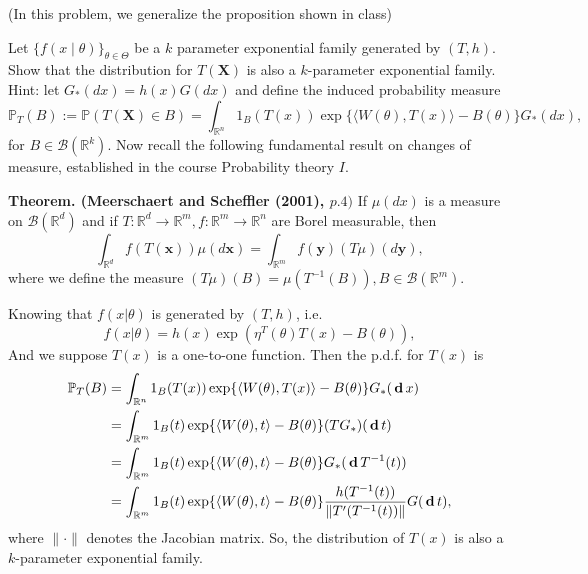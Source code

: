\begin{exercise}
    (In this problem, we generalize the proposition shown in class) 
    
    Let \(\{f( x \mid \theta)\}_{\theta \in \Theta}\) be a \(k\) parameter exponential family generated by \((T, h)\). Show that the distribution for \(T(\mathbf{X})\) is also a \(k\)-parameter exponential family. Hint: let \(G_{*}(d  x)=h( x) G(d  x)\) and define the induced probability measure
    \[
        \mathbb{P}_{T}(B):=\mathbb{P}(T(\mathbf{X}) \in B)=\int_{\mathbb{R}^{n}} 1_{B}(T( x)) \exp \{\langle W(\theta), T( x)\rangle-B(\theta)\} G_{*}(d  x), 
    \]
    for \(B \in \mathcal{B}\left(\mathbb{R}^{k}\right)\). Now recall the following fundamental result on changes of measure, established in the course Probability theory \(I\). 

    {\bfseries Theorem. (Meerschaert and Scheffler (2001), \(p .4)\)} If \(\mu(d x)\) is a measure on \(\mathcal{B}\left(\mathbb{R}^{d}\right)\) and if \(T: \mathbb{R}^{d} \rightarrow \mathbb{R}^{m}, f: \mathbb{R}^{m} \rightarrow \mathbb{R}^{n}\) are Borel measurable, then
    \[
        \int_{\mathbb{R}^{d}} f(T(\boldsymbol{x})) \mu(d \boldsymbol{x})=\int_{\mathbb{R}^{m}} f(\boldsymbol{y})(T \mu)(d \boldsymbol{y}),
    \]
    where we define the measure \((T \mu)(B)=\mu\left(T^{-1}(B)\right), B \in \mathcal{B}\left(\mathbb{R}^{m}\right)\). 
\end{exercise}

\begin{solution}
    Knowing that $f(x|\theta)$ is generated by $(T,h)$, i.e. 
    \[
        f(x|\theta)=h(x)\exp\left(\eta^T(\theta)T(x)-B(\theta)\right), 
    \]
    And we suppose $T(x)$ is a one-to-one function. Then the p.d.f. for $T(x)$ is
    \[
        \begin{aligned}
            \mathbb{P}_{T}(B)&=\int_{\mathbb{R}^{n}} 1_{B}(T( x)) \exp \{\langle W(\theta), T( x)\rangle-B(\theta)\} G_{*}(\,\mathbf{d}\,  x)\\
            &=\int_{\mathbb{R}^m}1_{B}(t) \exp \{\langle W(\theta), t\rangle-B(\theta)\}( TG_{*})(\,\mathbf{d}\, t)\\
            &=\int_{\mathbb{R}^m}1_{B}(t) \exp \{\langle W(\theta), t\rangle-B(\theta)\}G_*(\,\mathbf{d}\, T^{-1}(t))\\
            &=\int_{\mathbb{R}^m}1_{B}(t) \exp \{\langle W(\theta), t\rangle-B(\theta)\}\frac{h(T^{-1}(t))}{\|T'(T^{-1}(t))\|}G(\,\mathbf{d}\, t), 
        \end{aligned}
    \]
    where $\|\cdot\|$ denotes the Jacobian matrix. So, the distribution of $T(x)$ is also a $k$-parameter exponential family. 
\end{solution}

